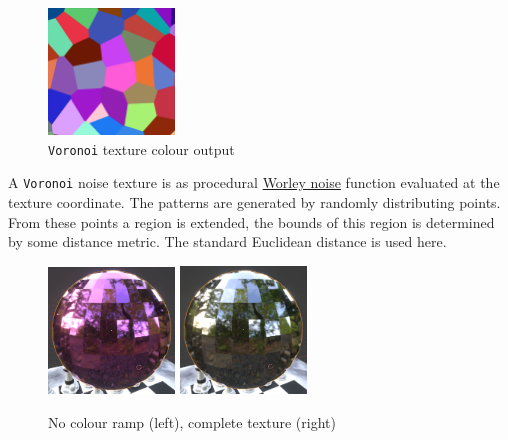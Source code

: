\documentclass[11pt]{article}
\begin{document}
\begin{figure}[htbp]
\centering
\includegraphics[width=0.3\textwidth]{Images/render_shader-nodes_textures_voronoi_smoothness-color-zero.png}
\caption{\texttt{Voronoi} texture colour output}
\end{figure}
A \texttt{Voronoi} noise texture is as procedural \href{https://en.wikipedia.org/wiki/Worley\_noise}{Worley noise} function evaluated at the texture
coordinate. The patterns are generated by randomly distributing points. From
these points a region is extended, the bounds of this region is determined by
some distance metric. The standard Euclidean distance is used here.

\begin{figure}[htbp]
\begin{center}
\includegraphics[width=0.3\textwidth]{Images/Purple.png}
\includegraphics[width=0.3\textwidth]{Images/discoclose.png}
\end{center}
\caption{No colour ramp (left), complete texture (right)}
\end{figure}
\end{document}
